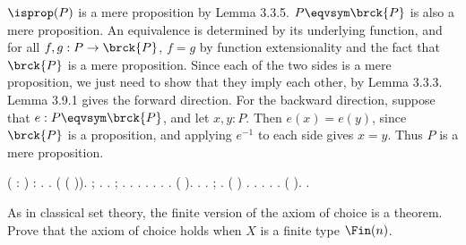  \soln
$\isprop(P)$ is a mere proposition by Lemma 3.3.5.  $P \eqvsym \brck{P}$ is
also a mere proposition.  An equivalence is determined by its underlying
function, and for all $f, g : P \to \brck{P}$, $f = g$ by function
extensionality and the fact that $\brck{P}$ is a mere proposition.  Since each
of the two sides is a mere proposition, we just need to show that they imply
each other, by Lemma 3.3.3.  Lemma 3.9.1 gives the forward direction.  For the
backward direction, suppose that $e : P \eqvsym \brck{P}$, and let $x, y : P$.
Then $e(x) = e(y)$, since $\brck{P}$ is a proposition, and applying $e^{-1}$ to
each side gives $x = y$.  Thus $P$ is a mere proposition.
\begin{coqdoccode}
\coqdocemptyline
\coqdocnoindent
{}  ( : ) :   \coqdocnotation{\ensuremath{\eqvsym}} \coqdocnotation{(} \coqdocnotation{\ensuremath{\eqvsym}}  \coqdocnotation{)}.\coqdoceol
\coqdocnoindent
{}.\coqdoceol
\coqdocindent{1.00em}
 ( ( \coqdocnotation{\ensuremath{\eqvsym}}  )).  ;   .\coqdoceol
\coqdocindent{1.00em}
 .  ;  .\coqdoceol
\coqdocindent{1.00em}
 .  .\coqdoceol
\coqdocindent{1.00em}
 .\coqdoceol
\coqdocemptyline
\coqdocindent{1.00em}
 .  .  .\coqdoceol
\coqdocindent{1.00em}
 ( ).  .\coqdoceol
\coqdocemptyline
\coqdocindent{1.00em}
 .  ;   .\coqdoceol
\coqdocindent{1.00em}
 (  \coqdocnotation{=}  )  .  .  .\coqdoceol
\coqdocindent{1.00em}
 \coqdocnotation{(}  \coqdocnotation{)\^{}}.  \coqdocnotation{(}  \coqdocnotation{)\^{}}.\coqdoceol
\coqdocindent{1.00em}
 (  ).\coqdoceol
\coqdocnoindent
{}.\coqdoceol
\coqdocemptyline
\end{coqdoccode}
As in classical set theory, the finite version of the axiom of choice is a
theorem.  Prove that the axiom of choice holds when $X$ is a finite type
$\Fin(n)$.


